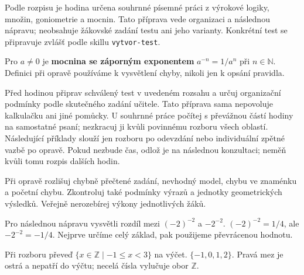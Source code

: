 \documentclass[11pt,a4paper]{article}
\begin{document}

Podle rozpisu je hodina určena souhrnné písemné práci z výrokové logiky, množin, goniometrie a mocnin. Tato příprava vede organizaci a následnou nápravu; neobsahuje žákovské zadání testu ani jeho varianty. Konkrétní test se připravuje zvlášť podle skillu \texttt{vytvor-test}.

\begin{definiceBox}[title={Připomenutí definice},breakable=false]
Pro $a\ne0$ je \textbf{mocnina se záporným exponentem} $a^{-n}=1/a^n$ při $n\in\mathbb N$. Definici při opravě používáme k vysvětlení chyby, nikoli jen k opsání pravidla.
\end{definiceBox}


Před hodinou připrav schválený test v uvedeném rozsahu a určuj organizační podmínky podle skutečného zadání učitele. Tato příprava sama nepovoluje kalkulačku ani jiné pomůcky. U souhrnné práce počítej s převážnou částí hodiny na samostatné psaní; nezkracuj ji kvůli povinnému rozboru všech oblastí. Následující příklady slouží jen rozboru po odevzdání nebo individuální zpětné vazbě po opravě. Pokud nezbude čas, odlož je na následnou konzultaci; neměň kvůli tomu rozpis dalších hodin.

Při opravě rozlišuj chybně přečtené zadání, nevhodný model, chybu ve znaménku a početní chybu. Zkontroluj také podmínky výrazů a jednotky geometrických výsledků. Veřejně nerozebírej výkony jednotlivých žáků.


\begin{prikladReseniBox}[title={Příklad 1},breakable=false]
Pro následnou nápravu vysvětli rozdíl mezi $(-2)^{-2}$ a $-2^{-2}$.
\tcblower
$(-2)^{-2}=1/4$, ale $-2^{-2}=-1/4$. Nejprve určíme celý základ, pak použijeme převrácenou hodnotu.
\end{prikladReseniBox}


\begin{prikladReseniBox}[title={Příklad 2},breakable=false]
Při rozboru převeď $\{x\in\mathbb Z\mid -1\le x<3\}$ na výčet.
\tcblower
$\{-1,0,1,2\}$. Pravá mez je ostrá a nepatří do výčtu; necelá čísla vylučuje obor $\mathbb Z$.
\end{prikladReseniBox}


\end{document}

